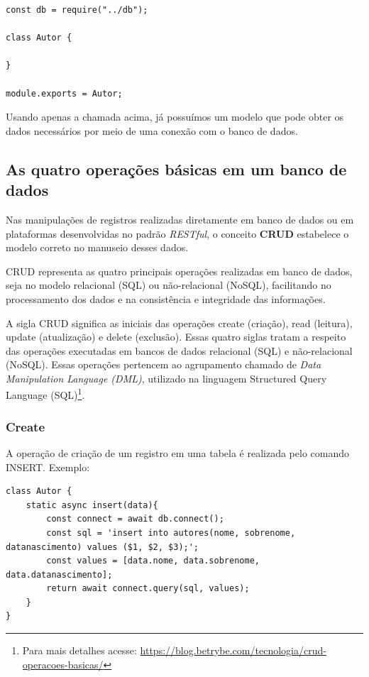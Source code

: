 \begin{verbatim}
const db = require("../db");

class Autor { 

}

module.exports = Autor;
\end{verbatim}

Usando apenas a chamada acima, já possuímos um modelo que pode obter os dados necessários por meio de uma conexão com o banco de dados. 

\subsection{As quatro operações básicas em um banco de dados}

Nas manipulações de registros realizadas diretamente em banco de dados ou em plataformas desenvolvidas no padrão \textit{RESTful}, o conceito \textbf{CRUD} estabelece o modelo correto no manuseio desses dados.

CRUD representa as quatro principais operações realizadas em banco de dados, seja no modelo relacional (SQL) ou não-relacional (NoSQL), facilitando no processamento dos dados e na consistência e integridade das informações.

A sigla CRUD significa as iniciais das operações create (criação), read (leitura), update (atualização) e delete (exclusão). Essas quatro siglas tratam a respeito das operações executadas em bancos de dados relacional (SQL) e não-relacional (NoSQL). Essas operações pertencem ao agrupamento chamado de \textit{Data Manipulation Language (DML)}, utilizado na linguagem Structured Query Language (SQL)\footnote{Para mais detalhes acesse: \url{https://blog.betrybe.com/tecnologia/crud-operacoes-basicas/}}.

\subsubsection{Create}

A operação de criação de um registro em uma tabela é realizada pelo comando INSERT. Exemplo:

\begin{verbatim}
class Autor {
	static async insert(data){
		const connect = await db.connect();
		const sql = 'insert into autores(nome, sobrenome, datanascimento) values ($1, $2, $3);';
		const values = [data.nome, data.sobrenome, data.datanascimento];
		return await connect.query(sql, values);
	}
}
\end{verbatim}

